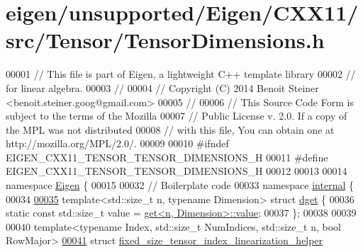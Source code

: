 \hypertarget{eigen_2unsupported_2_eigen_2_c_x_x11_2src_2_tensor_2_tensor_dimensions_8h_source}{}\section{eigen/unsupported/\+Eigen/\+C\+X\+X11/src/\+Tensor/\+Tensor\+Dimensions.h}
\label{eigen_2unsupported_2_eigen_2_c_x_x11_2src_2_tensor_2_tensor_dimensions_8h_source}

\begin{DoxyCode}
00001 \textcolor{comment}{// This file is part of Eigen, a lightweight C++ template library}
00002 \textcolor{comment}{// for linear algebra.}
00003 \textcolor{comment}{//}
00004 \textcolor{comment}{// Copyright (C) 2014 Benoit Steiner <benoit.steiner.goog@gmail.com>}
00005 \textcolor{comment}{//}
00006 \textcolor{comment}{// This Source Code Form is subject to the terms of the Mozilla}
00007 \textcolor{comment}{// Public License v. 2.0. If a copy of the MPL was not distributed}
00008 \textcolor{comment}{// with this file, You can obtain one at http://mozilla.org/MPL/2.0/.}
00009 
00010 \textcolor{preprocessor}{#ifndef EIGEN\_CXX11\_TENSOR\_TENSOR\_DIMENSIONS\_H}
00011 \textcolor{preprocessor}{#define EIGEN\_CXX11\_TENSOR\_TENSOR\_DIMENSIONS\_H}
00012 
00013 
00014 \textcolor{keyword}{namespace }\hyperlink{namespace_eigen}{Eigen} \{
00015 
00032 \textcolor{comment}{// Boilerplate code}
00033 \textcolor{keyword}{namespace }\hyperlink{namespaceinternal}{internal} \{
00034 
\hyperlink{struct_eigen_1_1internal_1_1dget}{00035} \textcolor{keyword}{template}<std::\textcolor{keywordtype}{size\_t} n, \textcolor{keyword}{typename} Dimension> \textcolor{keyword}{struct }\hyperlink{struct_eigen_1_1internal_1_1dget}{dget} \{
00036   \textcolor{keyword}{static} \textcolor{keyword}{const} std::size\_t value = \hyperlink{struct_eigen_1_1internal_1_1get}{get<n, Dimension>::value};
00037 \};
00038 
00039 
00040 \textcolor{keyword}{template}<\textcolor{keyword}{typename} Index, std::\textcolor{keywordtype}{size\_t} NumIndices, std::\textcolor{keywordtype}{size\_t} n, \textcolor{keywordtype}{bool} RowMajor>
\hyperlink{struct_eigen_1_1internal_1_1fixed__size__tensor__index__linearization__helper}{00041} \textcolor{keyword}{struct }\hyperlink{struct_eigen_1_1internal_1_1fixed__size__tensor__index__linearization__helper}{fixed\_size\_tensor\_index\_linearization\_helper}

\end{DoxyCode}

